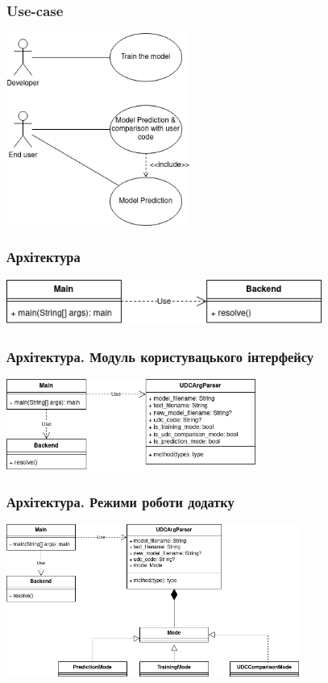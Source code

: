 \documentclass{beamer}
\begin{document}
\begin{frame}
\frametitle{Use-case}

\begin{center}
	\includegraphics[width=6cm]{use-case.drawio.png}
\end{center}

\end{frame}


\begin{frame}
\frametitle{Архітектура}
\begin{center}
	\includegraphics[height=1.5cm]{io_uml1.drawio.png}
\end{center}
\end{frame}

\begin{frame}
	\frametitle{Архітектура. Модуль користувацького інтерфейсу}
	\begin{center}
		\includegraphics[height=3cm]{io_uml2.drawio.png}
	\end{center}
\end{frame}

\begin{frame}
	\frametitle{Архітектура. Режими роботи додатку}
	\begin{center}
		\includegraphics[height=5cm]{io_uml3.drawio.png}
	\end{center}
\end{frame}
\end{document}
